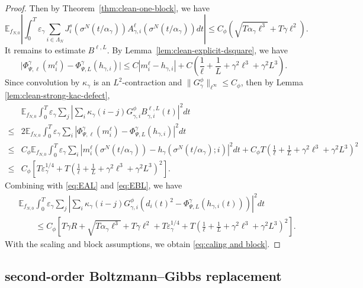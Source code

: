 \documentclass{article}
\begin{document}
\begin{proof}
Then by Theorem~\ref{thm:clean-one-block}, we have
\begin{equation}\label{eq:EAL}
    \mathbb E_{f_{N,0}}
\left|
\int_0^T \varepsilon_{\gamma} \sum_{i \in \Lambda_N}
J^{s}_i(\sigma^N(t/\alpha_\gamma))
A_{\gamma,i}^{\ell}(\sigma^N(t/\alpha_\gamma))dt
\right| \le C_\phi\left(\sqrt{T\alpha_\gamma\ell^3}+T\gamma\ell^2\right).
\end{equation}
It remains to estimate \(B^{\ell,L}\).  
By Lemma~\ref{lem:clean-explicit-dsquare}, we have
\[
\Big|\Phi_{\Psi,\ell}^{\gamma}(m_i^\ell)-
\Phi_{\Psi,L}^{\gamma}(h_{\gamma,i}) \Big|
\le
C|m_i^\ell-h_{\gamma,i}| +C\left(\frac1\ell+\frac1L+\gamma^2\ell^3+\gamma^2L^3\right).
\]
Since convolution by \(\kappa_\gamma\) is an \(L^2\)-contraction and \(\|G_\gamma^\phi\|_{\ell^\infty}\le C_\phi\), then by Lemma \ref{lem:clean-strong-kac-defect},  
\begin{align}\label{eq:EBL}
    &\mathbb E_{f_{N,0}}\int_0^T \varepsilon_\gamma\sum_j
\left| \sum_i\kappa_\gamma(i-j)G_{\gamma,i}^{\phi}B_{\gamma,i}^{\ell,L}(t) \right|^2dt \nonumber \\
\le & 2 \mathbb E_{f_{N,0}}
\int_0^T \varepsilon_\gamma\sum_i
\left|\Phi_{\Psi,\ell}^{\gamma}(m_i^\ell)-
\Phi_{\Psi,L}^{\gamma}(h_{\gamma,i})
\right|^2dt  \nonumber \\
\le &  C_\phi   \mathbb E_{f_{N,0}}\int_0^T
\varepsilon_\gamma\sum_i
\left|
 m_i^\ell(\sigma^N(t/\alpha_\gamma)) -h_\gamma(\sigma^N(t/\alpha_\gamma);i)
\right|^2dt + C_\phi T\left(
\frac1\ell+\frac1L+\gamma^2\ell^3+\gamma^2L^3
\right)^2 \nonumber \\
\le & C_\phi \left[T \varepsilon^{1/4}_{\gamma} +T\left(
\frac1\ell+\frac1L+\gamma^2\ell^3+\gamma^2L^3
\right)^2\right].
\end{align}
Combining with \eqref{eq:EAL} and \eqref{eq:EBL}, we have
\begin{align*}
    &\mathbb E_{f_{N,0}}\int_0^T \varepsilon_\gamma \sum_j\left| \sum_i \kappa_\gamma(i-j)G_{\gamma,i}^{\phi} \left( d_i(t)^2- \Phi_{\Psi,L}^{\gamma}(h_{\gamma,i}(t)) \right)\right|^2dt \nonumber \\
&\qquad\le
C_\phi \left[ T\gamma R + \sqrt{T\alpha_\gamma\ell^3}
+T\gamma\ell^2 + T \varepsilon^{1/4}_{\gamma}
+T\left(\frac1\ell+\frac1L+\gamma^2\ell^3+\gamma^2L^3\right)^2
\right].
\end{align*}
With the scaling and block assumptions, we obtain \eqref{eq:caling and block}.
\end{proof}


\subsection{second-order Boltzmann--Gibbs replacement}
\label{subsec:three-step-bg-proof}
\end{document}
